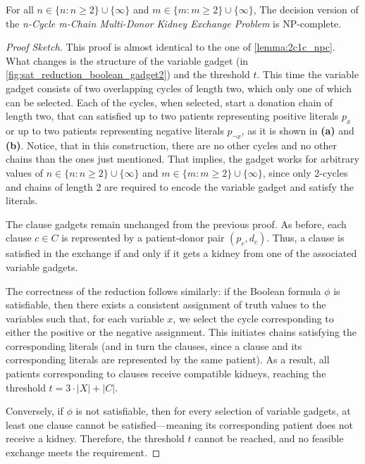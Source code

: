 \begin{lemma}
\label{lemma:ncmc_npc}
For all $n \in \{n : n \ge 2\} \cup \{\infty\}$ and $m \in \{m:m \ge 2\} \cup \{\infty\}$, The decision version of the \textit{n-Cycle m-Chain Multi-Donor Kidney Exchange Problem} is NP-complete.

\begin{proof}[Proof Sketch]
This proof is almost identical to the one of \autoref{lemma:2c1c_npc}. What changes is the structure of the variable gadget (in \autoref{fig:sat_reduction_boolean_gadget2}) and the threshold $t$. This time the variable gadget consists of two overlapping cycles of length two, which only one of which can be selected. Each of the cycles, when selected, start a donation chain of length two, that can satisfied up to two patients representing positive literals $p_x$ or up to two patients representing negative literals $p_{\neg{x}}$, as it is shown in \textbf{(a)} and \textbf{(b)}. Notice, that in this construction, there are no other cycles and no other chains than the ones just mentioned. That implies, the gadget works for arbitrary values of $n \in \{n : n \ge 2\} \cup \{\infty\}$ and $m \in \{m : m \ge 2\} \cup \{\infty\}$, since only 2-cycles and chains of length 2 are required to encode the variable gadget and satisfy the literals.

The clause gadgets remain unchanged from the previous proof. As before, each clause $c \in C$ is represented by a patient-donor pair $(p_c, d_c)$. Thus, a clause is satisfied in the exchange if and only if it gets a kidney from one of the associated variable gadgets.

The correctness of the reduction follows similarly: if the Boolean formula $\phi$ is satisfiable, then there exists a consistent assignment of truth values to the variables such that, for each variable $x$, we select the cycle corresponding to either the positive or the negative assignment. This initiates chains satisfying the corresponding literals (and in turn the clauses, since a clause and its corresponding literals are represented by the same patient). As a result, all patients corresponding to clauses receive compatible kidneys, reaching the threshold $t = 3 \cdot |X| + |C|$.

Conversely, if $\phi$ is not satisfiable, then for every selection of variable gadgets, at least one clause cannot be satisfied—meaning its corresponding patient does not receive a kidney. Therefore, the threshold $t$ cannot be reached, and no feasible exchange meets the requirement.


\end{proof}
\end{lemma}
